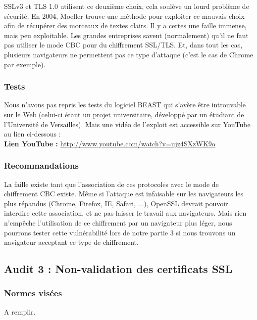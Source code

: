 			SSLv3 et TLS 1.0 utilisent ce deuxième choix, cela soulève un lourd problème de sécurité.	En 2004, Moeller \cite{moeller2004cbc} trouve une méthode pour exploiter ce mauvais choix afin de récupérer des morceaux de textes clairs. Il y a certes une faille immense, mais peu exploitable. Les grandes entreprises savent (normalement) qu'il ne faut pas utiliser le mode CBC pour du chiffrement SSL/TLS. Et, dans tout les cas, plusieurs navigateurs ne permettent pas ce type d'attaque (c'est le cas de Chrome par exemple).
			
		\subsubsection{Tests}
			
			Nous n'avons pas repris les tests du logiciel BEAST qui s'avère être introuvable sur le Web (celui-ci étant un projet universitaire, développé par un étudiant de l'Université de Versailles). Mais une vidéo de l'exploit est accessible sur YouTube au lien ci-dessous : \\
			
			\textbf{Lien YouTube : } \href{http://www.youtube.com/watch?v=ujz4SXzWK9o} {http://www.youtube.com/watch?v=ujz4SXzWK9o}
		
		\subsubsection{Recommandations}

			La faille existe tant que l'association de ces protocoles avec le mode de chiffrement CBC existe. Même si l'attaque est infaisable sur les navigateurs les plus répandus (Chrome, Firefox, IE, Safari, ...), OpenSSL devrait pouvoir interdire cette association, et ne pas laisser le travail aux navigateurs. 	Mais rien n'empêche l'utilisation de ce chiffrement par un navigateur plus léger, nous pourrons tester cette vulnérabilité lors de notre partie 3 si nous trouvons un navigateur acceptant ce type de chiffrement.				
			
	\subsection{Audit 3 : Non-validation des certificats SSL}
		\subsubsection{Normes visées}
	
			A remplir.

